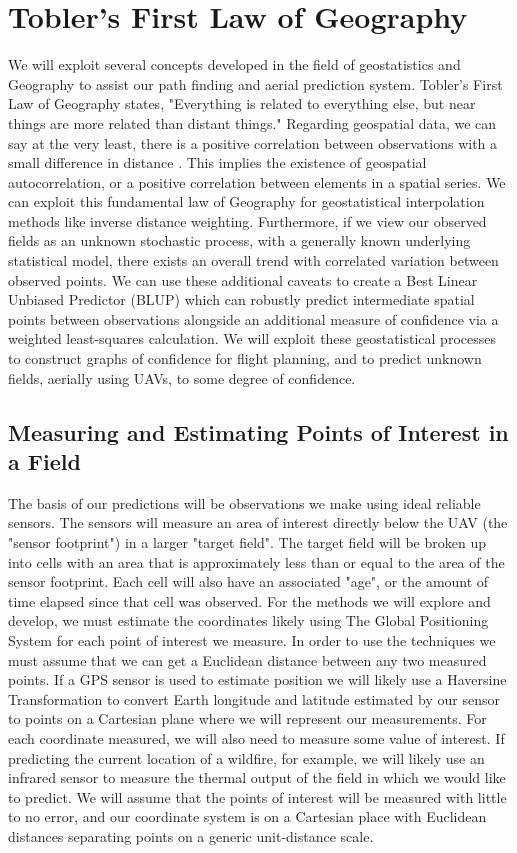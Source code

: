 \documentclass[11pt]{ucthesis}
\begin{document}
\section{Tobler's First Law of Geography}
We will exploit several concepts developed in the field of geostatistics and Geography to assist our path finding and aerial prediction system. Tobler's First Law of Geography \cite{tobler:first_law} states, "Everything is related to everything else, but near things are more related than distant things." Regarding geospatial data, we can say at the very least, there is a positive correlation between observations with a small difference in distance \cite{miller:on_toblers_first_law}. This implies the existence of geospatial autocorrelation, or a positive correlation between elements in a spatial series. We can exploit this fundamental law of Geography for geostatistical interpolation methods like inverse distance weighting. Furthermore, if we view our observed fields as an unknown stochastic process, with a generally known underlying statistical model, there exists an overall trend with correlated variation between observed points. We can use these additional caveats to create a Best Linear Unbiased Predictor (BLUP) which can robustly predict intermediate spatial points between observations alongside an additional measure of confidence via a weighted least-squares calculation. We will exploit these geostatistical processes to construct graphs of confidence for flight planning, and to predict unknown fields, aerially using UAVs, to some degree of confidence.

\subsection{Measuring and Estimating Points of Interest in a Field}
The basis of our predictions will be observations we make using ideal reliable sensors. The sensors will measure an area of interest directly below the UAV (the "sensor footprint") in a larger "target field". The target field will be broken up into cells with an area that is approximately less than or equal to the area of the sensor footprint. Each cell will also have an associated "age", or the amount of time elapsed since that cell was observed. For the methods we will explore and develop, we must estimate the coordinates likely using The Global Positioning System for each point of interest we measure. In order to use the techniques we must assume that we can get a Euclidean distance between any two measured points. If a GPS sensor is used to estimate position we will likely use a Haversine Transformation to convert Earth longitude and latitude estimated by our sensor to points on a Cartesian plane where we will represent our measurements. For each coordinate measured, we will also need to measure some value of interest. If predicting the current location of a wildfire, for example, we will likely use an infrared sensor to measure the thermal output of the field in which we would like to predict. We will assume that the points of interest will be measured with little to no error, and our coordinate system is on a Cartesian place with Euclidean distances separating points on a generic unit-distance scale.
\end{document}
